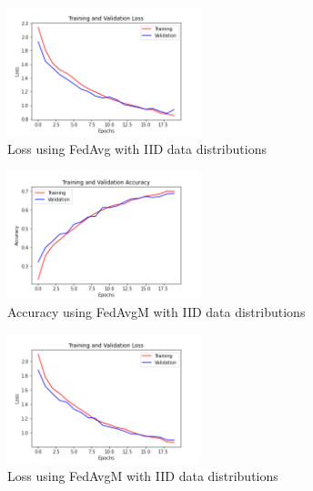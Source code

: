 \documentclass[twocolumn]{article}
\begin{document}
\begin{figure}
    \centering
    \includegraphics[width=0.5\textwidth,height=.3\textheight]{4_LossFedAvg_iid.png}
    \caption{Loss using FedAvg with IID data distributions}
     \label{LossFedAvgIid} 
\end{figure}

\begin{figure}
    \centering
    \includegraphics[width=0.5\textwidth,height=.3\textheight]{4_AccuracyFedAvgM_iid.png}
    \caption{Accuracy using FedAvgM with IID data distributions}
     \label{AccFedAvgMIid} 
\end{figure}

\begin{figure}
    \centering
    \includegraphics[width=0.5\textwidth,height=.3\textheight]{4_LossFedAvgM_iid.png}
    \caption{Loss using FedAvgM with IID data distributions}
     \label{LossFedAvgMIid} 
\end{figure}
\end{document}
